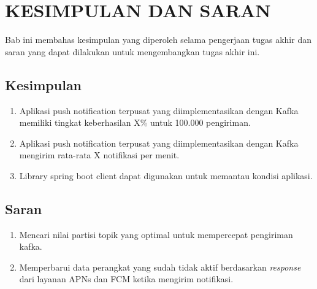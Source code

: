 \chapter{KESIMPULAN DAN SARAN}
\par Bab ini membahas kesimpulan yang diperoleh selama pengerjaan tugas akhir dan saran yang dapat dilakukan untuk mengembangkan tugas akhir ini.

\section{Kesimpulan}
\begin{enumerate}
    \item Aplikasi push notification terpusat yang diimplementasikan dengan Kafka memiliki tingkat keberhasilan X\% untuk 100.000 pengiriman.
    \item Aplikasi push notification terpusat yang diimplementasikan dengan Kafka mengirim rata-rata X notifikasi per menit.
    \item Library spring boot client dapat digunakan untuk memantau kondisi aplikasi.
\end{enumerate}

\section{Saran}
\begin{enumerate}
    \item Mencari nilai partisi topik yang optimal untuk mempercepat pengiriman kafka.
    \item Memperbarui data perangkat yang sudah tidak aktif berdasarkan \textit{response} dari layanan APNs dan FCM ketika mengirim notifikasi.
\end{enumerate}
